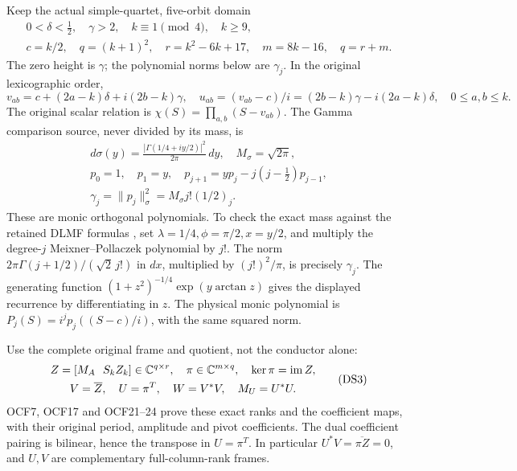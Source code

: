Keep the actual simple-quartet, five-orbit domain
\[
\begin{gathered}
0<\delta<\tfrac12,\quad \gamma>2,\quad k\equiv1\pmod4,\quad k\geq9,\\
c=k/2,\quad q=(k+1)^2,\quad r=k^2-6k+17,\quad m=8k-16,\quad q=r+m.
\end{gathered}
\]
The zero height is \(\gamma\); the polynomial norms below are
\(\gamma_j\). In the original lexicographic order,
\begin{equation}\label{dsroot:eq:roots}
v_{ab}=c+(2a-k)\delta+i(2b-k)\gamma,
\quad u_{ab}=(v_{ab}-c)/i
=(2b-k)\gamma-i(2a-k)\delta,
\quad 0\leq a,b\leq k.
\tag{DS1}
\end{equation}
The original scalar relation is \(\chi(S)=\prod_{a,b}(S-v_{ab})\).
The Gamma comparison source, never divided by its mass, is
\begin{equation}\label{dsroot:eq:gamma}
\begin{gathered}
d\sigma(y)=\frac{|\Gamma(1/4+iy/2)|^2}{2\pi}\,dy,\quad M_\sigma=\sqrt{2\pi},\\
p_0=1,\quad p_1=y,\quad p_{j+1}=yp_j-j(j-\tfrac12)p_{j-1},\\
\gamma_j=\|p_j\|_\sigma^2=M_\sigma j!(1/2)_j.
\end{gathered}
\tag{DS2}
\end{equation}
These are monic orthogonal polynomials. To check the exact mass against
the retained DLMF formulas \cite[18.19.E8--E9a,18.23.E7]{dsroot:DLMF}, set
\(\lambda=1/4,\phi=\pi/2,x=y/2\), and multiply the degree-\(j\)
Meixner--Pollaczek polynomial by \(j!\). The norm
\(2\pi\Gamma(j+1/2)/(\sqrt2\,j!)\) in \(dx\), multiplied by
\((j!)^2/\pi\), is precisely \(\gamma_j\). The generating function
\((1+z^2)^{-1/4}\exp(y\arctan z)\) gives the displayed recurrence
by differentiating in \(z\). The physical monic polynomial is
\(P_j(S)=i^jp_j((S-c)/i)\), with the same squared norm.

Use the complete original frame and quotient, not the conductor alone:
\begin{equation}\label{dsroot:eq:frames}
\begin{gathered}
Z=[M_A\ \ S_kZ_k]\in\mathbb C^{q\times r},\quad \pi\in\mathbb C^{m\times q},\quad \ker\pi=\operatorname{im}Z,\\
V=\overline Z,\quad U=\pi^T,\quad W=V^*V,\quad M_U=U^*U.
\end{gathered}
\tag{DS3}
\end{equation}
OCF7, OCF17 and OCF21--24 prove these exact ranks and the coefficient
maps, with their original period, amplitude and pivot coefficients.
The dual coefficient pairing is bilinear, hence the transpose in
\(U=\pi^T\). In particular \(U^*V=\overline{\pi Z}=0\), and
\(U,V\) are complementary full-column-rank frames.

